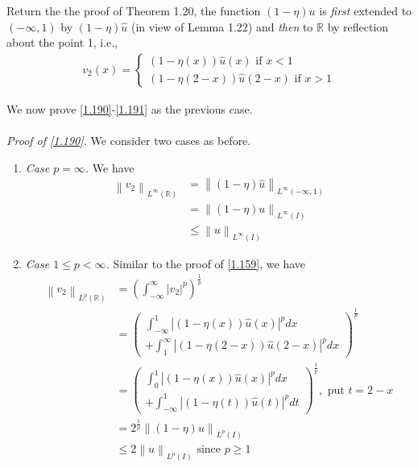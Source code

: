 \documentclass[a4paper,oneside]{article}
\numberwithin{equation}{section}
\begin{document}
Return the the proof of Theorem 1.20, the function $\left(1-\eta \right)u$ is \textit{first} extended to $\left(-\infty,1\right)$ by $\left(1-\eta \right)\hat u$ (in view of Lemma 1.22) and \textit{then} to $\mathbb{R}$ by reflection about the point 1, i.e.,
\begin{align}
{v_2}\left( x \right) = \left\{ {\begin{array}{*{20}{c}}
{\left( {1 - \eta \left( x \right)} \right)\hat u\left( x \right)\mbox{ if } x < 1}\\
{\left( {1 - \eta \left( {2 - x} \right)} \right)\hat u\left( {2 - x} \right)\mbox{ if } x > 1}
\end{array}} \right.
\end{align}

We now prove \eqref{1.190}-\eqref{1.191} as the previous case.\\
\\
\textit{Proof of \eqref{1.190}.} We consider two cases as before.
\begin{enumerate}
\item \textit{Case $p=\infty$.} We have
\begin{align}
{\left\| {{v_2}} \right\|_{{L^\infty }\left( \mathbb{R} \right)}} &= {\left\| {\left( {1 - \eta } \right)\hat u} \right\|_{{L^\infty }\left( { - \infty ,1} \right)}}\\
 &= {\left\| {\left( {1 - \eta } \right)u} \right\|_{{L^\infty }\left( I \right)}}\\
 &\le {\left\| u \right\|_{{L^\infty }\left( I \right)}}
\end{align}
\item \textit{Case $1\le p<\infty$.} Similar to the proof of \eqref{1.159}, we have
\begin{align}
{\left\| {{v_2}} \right\|_{{L^p}\left( \mathbb{R} \right)}} &= {\left( {\int_{ - \infty }^\infty  {{{\left| {{v_2}} \right|}^p}} } \right)^{\frac{1}{p}}}\\
& = {\left( \begin{array}{l}
\int_{ - \infty }^1 {{{\left| {\left( {1 - \eta \left( x \right)} \right)\hat u\left( x \right)} \right|}^p}dx} \\
 + \int_1^\infty  {{{\left| {\left( {1 - \eta \left( {2 - x} \right)} \right)\hat u\left( {2 - x} \right)} \right|}^p}dx} 
\end{array} \right)^{\frac{1}{p}}}\\
& = {\left( \begin{array}{l}
\int_0^1 {{{\left| {\left( {1 - \eta \left( x \right)} \right)\hat u\left( x \right)} \right|}^p}dx} \\
 + \int_{ - \infty }^1 {{{\left| {\left( {1 - \eta \left( t \right)} \right)\hat u\left( t \right)} \right|}^p}dt} 
\end{array} \right)^{\frac{1}{p}}},\mbox{ put } t = 2 - x\\
& = {2^{\frac{1}{p}}}{\left\| {\left( {1 - \eta } \right)u} \right\|_{{L^p}\left( I \right)}}\\
& \le 2{\left\| u \right\|_{{L^p}\left( I \right)}}\mbox{ since } p \ge 1
\end{align}
\end{enumerate}
\end{document}
